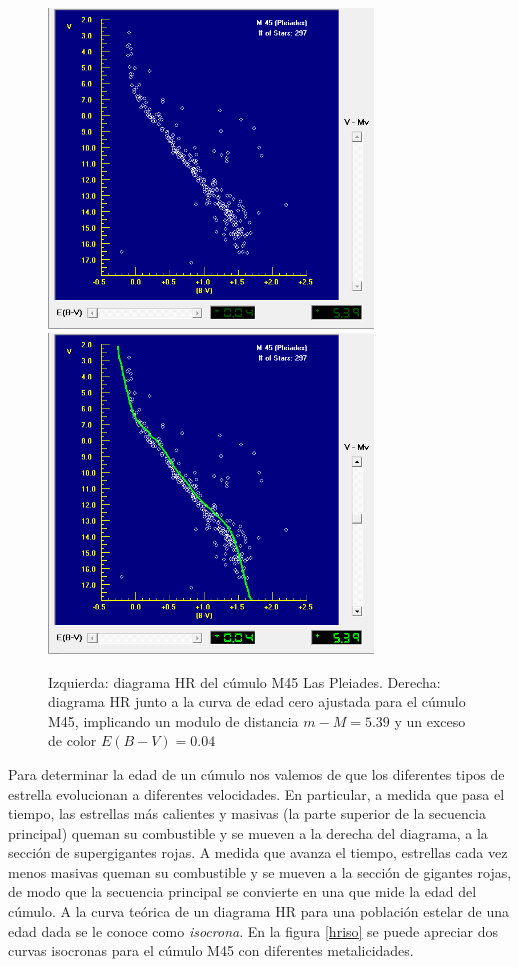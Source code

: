 \documentclass[12pt]{article}
\begin{document}
\begin{figure}[H]
    \includegraphics[width= 3.40in]{plea0.png}
    \includegraphics[width= 3.40in]{plea1.png}
  \caption{Izquierda: diagrama HR del cúmulo M45 Las Pleiades. Derecha: diagrama HR junto a la curva de edad cero ajustada para el cúmulo M45, implicando un modulo de distancia $m - M = 5.39$ y un exceso de color $E(B-V) = 0.04$}
  \label{edadCero}
\end{figure}


Para determinar la edad de un cúmulo nos valemos de que los diferentes tipos de estrella evolucionan a diferentes velocidades. En particular, a medida que pasa el tiempo, las estrellas más calientes y masivas (la parte superior de la secuencia principal) queman su combustible y se mueven a la derecha del diagrama, a la sección de supergigantes rojas.
A medida que avanza el tiempo, estrellas cada vez menos masivas queman su combustible y se mueven a la sección de gigantes rojas, de modo que la secuencia principal se convierte en una  que mide la edad del cúmulo.
A la curva teórica de un diagrama HR para una población estelar de una edad dada se le conoce como \emph{isocrona}. En la figura \ref{hriso} se puede apreciar dos curvas isocronas para el cúmulo M45 con diferentes metalicidades.
\end{document}
